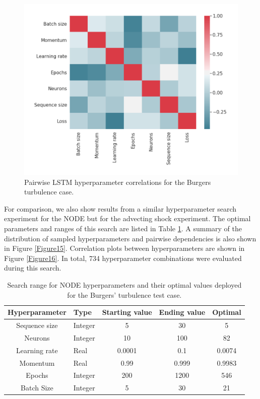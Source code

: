 \documentclass[preprint,12pt]{elsarticle}
\begin{document}
\begin{figure}
	\centering
	\includegraphics[width=\textwidth]{Figure_19.pdf}
	\caption{Pairwise LSTM hyperparameter correlations for the Burgers turbulence case.}
	\label{Figure14}
\end{figure}

For  comparison, we also show results from a similar hyperparameter search experiment for the NODE but for the advecting shock experiment. The optimal parameters and ranges of this search are listed in Table \ref{Table2}. A summary of the distribution of sampled hyperparameters and pairwise dependencies is also shown in Figure \ref{Figure15}. Correlation plots between hyperparameters are shown in Figure \ref{Figure16}. In total, 734 hyperparameter combinations were evaluated during this search.


\begin{table}[]
\caption{Search range for NODE hyperparameters and their optimal values deployed for the Burgers' turbulence test case.}
\label{Table2}
\begin{tabular}{|c|l|c|c|c|}
\hline
Hyperparameter & Type    & Starting value & Ending value & Optimal \\ \hline
Sequence size  & Integer & 5              & 30           & 5       \\ \hline
Neurons        & Integer & 10             & 100          & 82      \\ \hline
Learning rate  & Real    & 0.0001         & 0.1          & 0.0074 \\ \hline
Momentum       & Real    & 0.99           & 0.999        & 0.9983  \\ \hline
Epochs         & Integer & 200            & 1200         & 546     \\ \hline
Batch Size     & Integer & 5              & 30           & 21      \\ \hline
\end{tabular}
\end{table}
\end{document}
